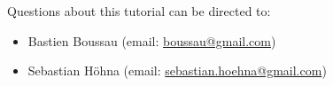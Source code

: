 \bigskip
Questions about this tutorial can be directed to: \\\vspace{-10mm}
\begin{itemize}
\item Bastien Boussau (email: \href{mailto:boussau@gmail.com}{boussau@gmail.com}) \\\vspace{-8mm}
\item Sebastian H\"{o}hna (email: \href{mailto:sebastian.hoehna@gmail.com}{sebastian.hoehna@gmail.com})
\end{itemize}






